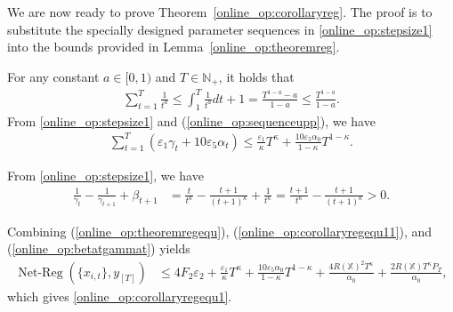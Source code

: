 \documentclass[12pt,draftcls,onecolumn]{IEEEtran}%
\DeclareMathOperator{\NetReg}{Net-Reg}
\begin{document}
We are now ready to prove Theorem~\ref{online_op:corollaryreg}. The proof is to substitute the specially designed parameter sequences in \eqref{online_op:stepsize1} into the bounds provided in Lemma~\ref{online_op:theoremreg}.

 For any constant $a\in[0,1)$ and $T\in\mathbb{N}_+$, it holds that
\begin{align}\label{online_op:sequenceupp}
\sum_{t=1}^T\frac{1}{t^a}\le\int_1^T\frac{1}{t^a}dt+1=\frac{T^{1-a}-a}{1-a}\le\frac{T^{1-a}}{1-a}.
\end{align}
From \eqref{online_op:stepsize1} and (\ref{online_op:sequenceupp}), we have
\begin{align}
\sum_{t=1}^T(\varepsilon_1\gamma_{t}+10\varepsilon_5\alpha_{t})
\le\frac{\varepsilon_1}{\kappa}T^{\kappa}+\frac{10\varepsilon_5\alpha_0}{1-\kappa}T^{1-\kappa}.
\label{online_op:corollaryregequ11}
\end{align}

 From \eqref{online_op:stepsize1}, we have
\begin{align}\label{online_op:betatgammat}
\frac{1}{\gamma_{t}}-\frac{1}{\gamma_{t+1}}+\beta_{t+1}
&=\frac{t}{t^\kappa}-\frac{t+1}{(t+1)^\kappa}+\frac{1}{t^\kappa}
=\frac{t+1}{t^\kappa}-\frac{t+1}{(t+1)^\kappa}>0.
\end{align}



Combining  (\ref{online_op:theoremregequ}), (\ref{online_op:corollaryregequ11}), and (\ref{online_op:betatgammat}) yields
\begin{align}\label{online_op:corollaryregequ1_proof}
\NetReg(\{x_{i,t}\},y_{[T]})
&\le 4F_2\varepsilon_2
+\frac{\varepsilon_1}{\kappa}T^\kappa+\frac{10\varepsilon_5\alpha_0}{1-\kappa}T^{1-\kappa}
+\frac{4R(\mathbb{X})^2T^\kappa}{\alpha_0}+\frac{2R(\mathbb{X})T^\kappa P_T}{\alpha_0},
\end{align}
which gives \eqref{online_op:corollaryregequ1}.
\end{document}
